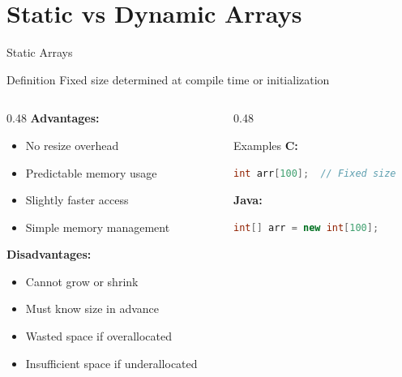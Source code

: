 \documentclass[aspectratio=169,xcolor=dvipsnames]{beamer}
\begin{document}
\section{Static vs Dynamic Arrays}

\begin{frame}[fragile]{Static Arrays}
  \begin{block}{Definition}
    Fixed size determined at compile time or initialization
  \end{block}

  \begin{columns}
    \begin{column}{0.48\textwidth}
      \textbf{Advantages:}
      \begin{itemize}
        \item No resize overhead
        \item Predictable memory usage
        \item Slightly faster access
        \item Simple memory management
      \end{itemize}

      \vspace{0.3cm}

      \textbf{Disadvantages:}
      \begin{itemize}
        \item Cannot grow or shrink
        \item Must know size in advance
        \item Wasted space if overallocated
        \item Insufficient space if underallocated
      \end{itemize}
    \end{column}
    \begin{column}{0.48\textwidth}
      \begin{exampleblock}{Examples}
        \textbf{C:}
        \begin{lstlisting}[language=C,basicstyle=\tiny\ttfamily]
int arr[100];  // Fixed size
        \end{lstlisting}

        \textbf{Java:}
        \begin{lstlisting}[language=Java,basicstyle=\tiny\ttfamily]
int[] arr = new int[100];
        \end{lstlisting}


\end{exampleblock}
\end{column}
\end{columns}
\end{frame}
\end{document}
